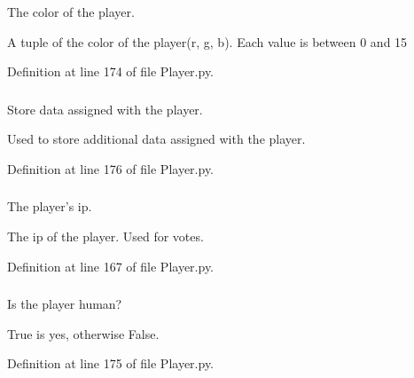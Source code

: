 The color of the player. 

A tuple of the color of the player(r, g, b). Each value is between 0 and 15 

Definition at line 174 of file Player.py.

\hypertarget{class_player_1_1_player_a1a50d6ee0682ff86b83ea314dfa58ce6}{
\subsubsection[{data}]{}}
\label{class_player_1_1_player_a1a50d6ee0682ff86b83ea314dfa58ce6}


Store data assigned with the player. 

Used to store additional data assigned with the player. 

Definition at line 176 of file Player.py.

\hypertarget{class_player_1_1_player_a48ed10bfc12677f9c41e2cae6daafa49}{
\subsubsection[{ip}]{}}
\label{class_player_1_1_player_a48ed10bfc12677f9c41e2cae6daafa49}


The player's ip. 

The ip of the player. Used for votes. 

Definition at line 167 of file Player.py.

\hypertarget{class_player_1_1_player_a01b505c0fe5ff3d20d75327800b1552e}{
\subsubsection[{is\_\-human}]{}}
\label{class_player_1_1_player_a01b505c0fe5ff3d20d75327800b1552e}


Is the player human? 

True is yes, otherwise False. 

Definition at line 175 of file Player.py.

\hypertarget{class_player_1_1_player_a6cea7416f6b4ce563211f3194033f671}{
\subsubsection[{name}]{}}
\label{class_player_1_1_player_a6cea7416f6b4ce563211f3194033f671}


